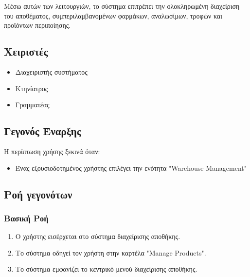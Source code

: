 \documentclass[12pt,a4paper,twoside]{book}
\begin{document}
Μέσω αυτών των λειτουργιών, το σύστημα επιτρέπει την ολοκληρωμένη διαχείριση του αποθέματος, συμπεριλαμβανομένων φαρμάκων, αναλωσίμων, τροφών και προϊόντων περιποίησης. %

\subsection{Χειριστές}
\begin{itemize}
  \item Διαχειριστής συστήματος
  \item Κτηνίατρος
  \item Γραμματέας
\end{itemize}

\subsection{Γεγονός Έναρξης}
Η περίπτωση χρήσης ξεκινά όταν:
\begin{itemize}
  \item Ένας εξουσιοδοτημένος χρήστης επιλέγει την ενότητα "Warehouse Management" %
\end{itemize}

\subsection{Ροή γεγονότων}

\subsubsection{Βασική Ροή}
\begin{enumerate}
  \item Ο χρήστης εισέρχεται στο σύστημα διαχείρισης αποθήκης. %
  \item Το σύστημα οδηγεί τον χρήστη στην καρτέλα "Manage Products". %
  \item Το σύστημα εμφανίζει το κεντρικό μενού διαχείρισης αποθήκης. %
\end{enumerate}
\end{document}
